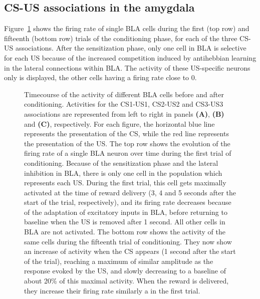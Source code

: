 \documentclass[
  11pt,
  a4paper,
]{scrbook}
\begin{document}
\subsection{CS-US associations in the
amygdala}\label{sec-finr:results-amygdala}

Figure~\ref{fig-finr:bla_conditioning} shows the firing rate of single
BLA cells during the first (top row) and fifteenth (bottom row) trials
of the conditioning phase, for each of the three CS-US associations.
After the sensitization phase, only one cell in BLA is selective for
each US because of the increased competition induced by antihebbian
learning in the lateral connections within BLA. The activity of these
US-specific neurons only is displayed, the other cells having a firing
rate close to 0.

\begin{figure}


\caption{\label{fig-finr:bla_conditioning}Timecourse of the activity of
different BLA cells before and after conditioning. Activities for the
CS1-US1, CS2-US2 and CS3-US3 associations are represented from left to
right in panels \textbf{(A)}, \textbf{(B)} and \textbf{(C)},
respectively. For each figure, the horizontal blue line represents the
presentation of the CS, while the red line represents the presentation
of the US. The top row shows the evolution of the firing rate of a
single BLA neuron over time during the first trial of conditioning.
Because of the sensitization phase and the lateral inhibition in BLA,
there is only one cell in the population which represents each US.
During the first trial, this cell gets maximally activated at the time
of reward delivery (3, 4 and 5 seconds after the start of the trial,
respectively), and its firing rate decreases because of the adaptation
of excitatory inputs in BLA, before returning to baseline when the US is
removed after 1 second. All other cells in BLA are not activated. The
bottom row shows the activity of the same cells during the fifteenth
trial of conditioning. They now show an increase of activity when the CS
appears (1 second after the start of the trial), reaching a maximum of
similar amplitude as the response evoked by the US, and slowly
decreasing to a baseline of about 20\% of this maximal activity. When
the reward is delivered, they increase their firing rate similarly a in
the first trial.}


\end{figure}
\end{document}
